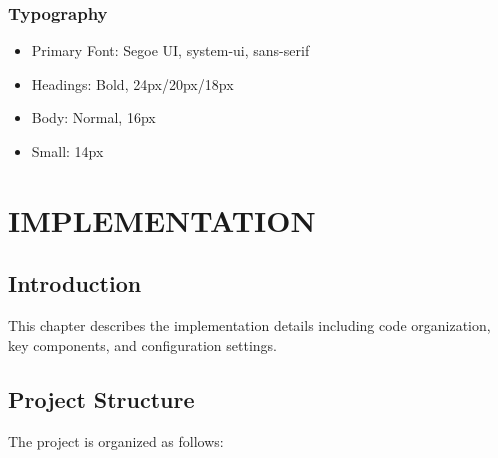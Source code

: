 \documentclass[12pt,a4paper,twoside]{book}
\begin{document}
\subsection{Typography}
\begin{itemize}
    \item Primary Font: Segoe UI, system-ui, sans-serif
    \item Headings: Bold, 24px/20px/18px
    \item Body: Normal, 16px
    \item Small: 14px
\end{itemize}

\chapter{IMPLEMENTATION}

\section{Introduction}

This chapter describes the implementation details including code organization, key components, and configuration settings.

\section{Project Structure}

The project is organized as follows:
\end{document}
